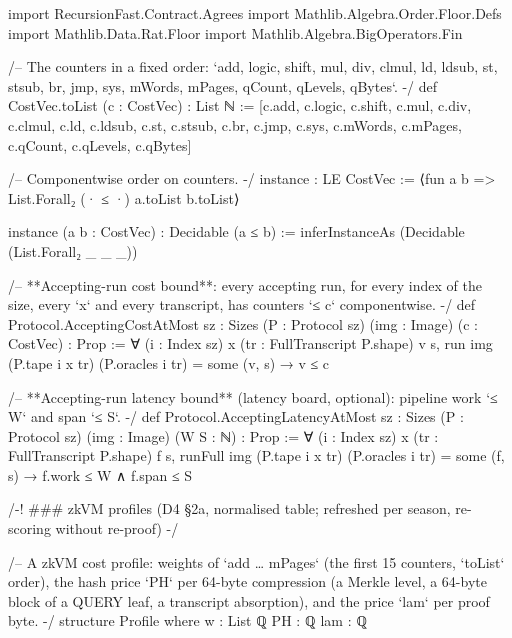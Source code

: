 \begin{leancode}[fontsize=\scriptsize,label={\footnotesize Contract/Cost.lean}]
import RecursionFast.Contract.Agrees
import Mathlib.Algebra.Order.Floor.Defs
import Mathlib.Data.Rat.Floor
import Mathlib.Algebra.BigOperators.Fin

/-- The counters in a fixed order: `add, logic, shift, mul, div, clmul, ld, ldsub, st, stsub,
br, jmp, sys, mWords, mPages, qCount, qLevels, qBytes`. -/
def CostVec.toList (c : CostVec) : List ℕ :=
  [c.add, c.logic, c.shift, c.mul, c.div, c.clmul, c.ld, c.ldsub, c.st, c.stsub, c.br, c.jmp,
    c.sys, c.mWords, c.mPages, c.qCount, c.qLevels, c.qBytes]

/-- Componentwise order on counters. -/
instance : LE CostVec := ⟨fun a b => List.Forall₂ (· ≤ ·) a.toList b.toList⟩

instance (a b : CostVec) : Decidable (a ≤ b) := inferInstanceAs (Decidable (List.Forall₂ _ _ _))

/-- **Accepting-run cost bound**: every accepting run, for every index of the size, every `x`
and every transcript, has counters `≤ c` componentwise. -/
def Protocol.AcceptingCostAtMost {sz : Sizes} (P : Protocol sz) (img : Image) (c : CostVec) : Prop :=
  ∀ (i : Index sz) x (tr : FullTranscript P.shape) v s, run img (P.tape i x tr) (P.oracles i tr) = some (v, s) →
      v ≤ c

/-- **Accepting-run latency bound** (latency board, optional): pipeline work `≤ W` and span `≤ S`. -/
def Protocol.AcceptingLatencyAtMost {sz : Sizes} (P : Protocol sz) (img : Image) (W S : ℕ) : Prop :=
  ∀ (i : Index sz) x (tr : FullTranscript P.shape) f s,
    runFull img (P.tape i x tr) (P.oracles i tr) = some (f, s) → f.work ≤ W ∧ f.span ≤ S

/-! ### zkVM profiles (D4 §2a, normalised table; refreshed per season, re-scoring without re-proof) -/

/-- A zkVM cost profile: weights of `add … mPages` (the first 15 counters, `toList` order),
the hash price `PH` per 64-byte compression (a Merkle level, a 64-byte block of a QUERY leaf, a
transcript absorption), and the price `lam` per proof byte. -/
structure Profile where
  w : List ℚ
  PH : ℚ
  lam : ℚ


\end{leancode}

